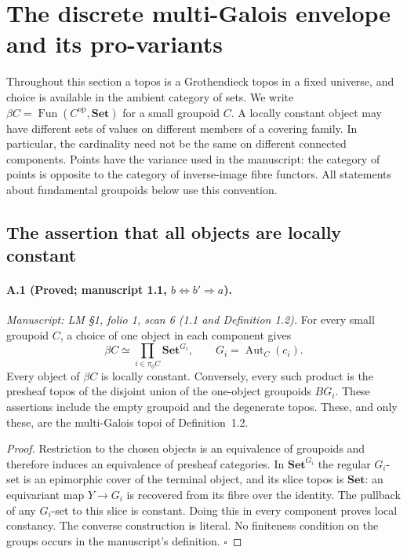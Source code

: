 \section{The discrete multi-Galois envelope and its pro-variants}
\label{sec:A}

Throughout this section a topos is a Grothendieck topos in a fixed universe, and choice is available in the ambient category of sets. We write $\beta C=\operatorname{Fun}(C^{\mathrm{op}},\mathbf{Set})$ for a small groupoid $C$. A locally constant object may have different sets of values on different members of a covering family. In particular, the cardinality need not be the same on different connected components. Points have the variance used in the manuscript: the category of points is opposite to the category of inverse-image fibre functors. All statements about fundamental groupoids below use this convention.

\subsection{The assertion that all objects are locally constant}

\paragraph{A.1 (Proved; manuscript 1.1, $b\Leftrightarrow b'\Rightarrow a$).}
\textit{Manuscript: LM \S1, folio 1, scan 6 (1.1 and Definition 1.2).}
For every small groupoid $C$, a choice of one object in each component gives
\[
 \beta C\simeq\prod_{i\in\pi_0C}\mathbf{Set}^{G_i},
 \qquad G_i=\operatorname{Aut}_C(c_i).
\]
Every object of $\beta C$ is locally constant. Conversely, every such product is the presheaf topos of the disjoint union of the one-object groupoids $BG_i$. These assertions include the empty groupoid and the degenerate topos. These, and only these, are the multi-Galois topoi of Definition~1.2.
\begin{proof}
Restriction to the chosen objects is an equivalence of groupoids and therefore induces an equivalence of presheaf categories. In $\mathbf{Set}^{G_i}$ the regular $G_i$-set is an epimorphic cover of the terminal object, and its slice topos is $\mathbf{Set}$: an equivariant map $Y\to G_i$ is recovered from its fibre over the identity. The pullback of any $G_i$-set to this slice is constant. Doing this in every component proves local constancy. The converse construction is literal. No finiteness condition on the groups occurs in the manuscript's definition. \hfill$\square$
\end{proof}

